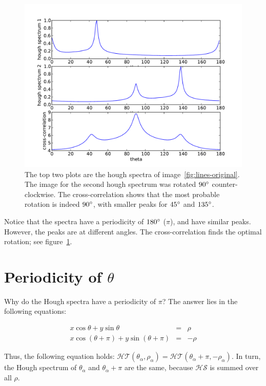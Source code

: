 \begin{figure}[ht]
	\centering
	\includegraphics[width=\textwidth]{images/stitching/lines-cross-correlation.pdf}
	\caption{The top two plots are the hough spectra of image~\ref{fig:lines-original}. The image for the second hough spectrum was rotated $90\degree$ counter-clockwise. The cross-correlation shows that the most probable rotation is indeed $90\degree$, with smaller peaks for $45\degree$ and $135\degree$.}
	\label{fig:lines-cross-correlation}
\end{figure}

Notice that the spectra have a periodicity of $180\degree$ ($\pi$), and have similar peaks. However, the peaks are at different angles. The cross-correlation finds the optimal rotation; see figure~\ref{fig:lines-cross-correlation}.

\section{Periodicity of $\theta$}
\label{sub:periodicity}
Why do the Hough spectra have a periodicity of $\pi$? The answer lies in the following equations:

\begin{eqnarray}
x\cos \theta + y\sin \theta &=& \rho \\
x\cos(\theta + \pi) + y\sin (\theta + \pi) &=& -\rho
\end{eqnarray}

Thus, the following equation holds: $\mathcal{HT}(\theta_\alpha, \rho_\alpha) = \mathcal{HT}(\theta_\alpha + \pi, -\rho_\alpha)$. In turn, the Hough spectrum of $\theta_\alpha$ and $\theta_\alpha + \pi$ are the same, because $\mathcal{HS}$ is summed over all $\rho$. 

